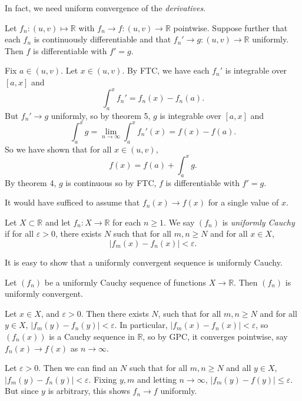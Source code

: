 \documentclass[12pt]{article}
\begin{document}
In fact, we need uniform convergence of the \textit{derivatives}.

\begin{theorem}
	Let $f_n : (u, v) \mapsto \mathbb{R}$ with $f_n \to f : (u, v) \to \mathbb{R}$ pointwise. Suppose further that each $f_n$ is continuously differentiable and that $f_n' \to g : (u, v) \to \mathbb{R}$ uniformly. Then $f$ is differentiable with $f' = g$.
\end{theorem}

\begin{proofbox}
	Fix $a \in (u, v)$. Let $x \in (u, v)$. By FTC, we have each $f_n'$ is integrable over $[a, x]$ and
	\[
		\int_{a}^{x}f_n' = f_n(x) - f_n(a)
	.\]
	But $f_n' \to g$ uniformly, so by theorem 5, $g$ is integrable over $[a, x]$ and
	\[
		\int_{a}^{x}g = \lim_{n \to \infty} \int_{a}^{x} f_n' (x) = f(x) - f(a)
	.\]
	So we have shown that for all $x \in (u, v)$,
	\[
		f(x) = f(a) + \int_{a}^{x} g
	.\]
	By theorem 4, $g$ is continuous so by FTC, $f$ is differentiable with $f' = g$.
\end{proofbox}

\begin{remark}
	It would have sufficed to assume that $f_n(x) \to f(x)$ for a single value of $x$.
\end{remark}

\begin{definition}
	Let $X \subset \mathbb{R}$ and let $f_n : X \to \mathbb{R}$ for each $n \geq 1$. We say $(f_n)$ is \textit{uniformly Cauchy} if for all $\varepsilon > 0$, there exists $N$ such that for all $m, n \geq N$ and for all $x \in X$,
	\[
		|f_m(x) - f_n(x)| < \varepsilon
	.\]
\end{definition}
It is easy to show that a uniformly convergent sequence is uniformly Cauchy.

\begin{theorem}
	Let $(f_n)$ be a uniformly Cauchy sequence of functions $X \to \mathbb{R}$. Then $(f_n)$ is uniformly convergent.
\end{theorem}

\begin{proofbox}
	Let $x \in X$, and $\varepsilon > 0$. Then there exists $N$, such that for all $m, n \geq N$ and for all $y \in X$, $|f_m(y) - f_n(y)| < \varepsilon$. In particular, $|f_m(x) - f_n(x)| < \varepsilon$, so $(f_n(x))$ is a Cauchy sequence in $\mathbb{R}$, so by GPC, it converges pointwise, say $f_n(x) \to f(x)$ as $n \to \infty$.

	Let $\varepsilon > 0$. Then we can find an $N$ such that for all $m, n \geq N$ and all $y \in X$, $|f_m(y) - f_n(y)| < \varepsilon$. Fixing $y, m$ and letting $n \to \infty$, $|f_m(y) - f(y)| \leq \varepsilon$. But since $y$ is arbitrary, this shows $f_n \to f$ uniformly.
\end{proofbox}
\end{document}
